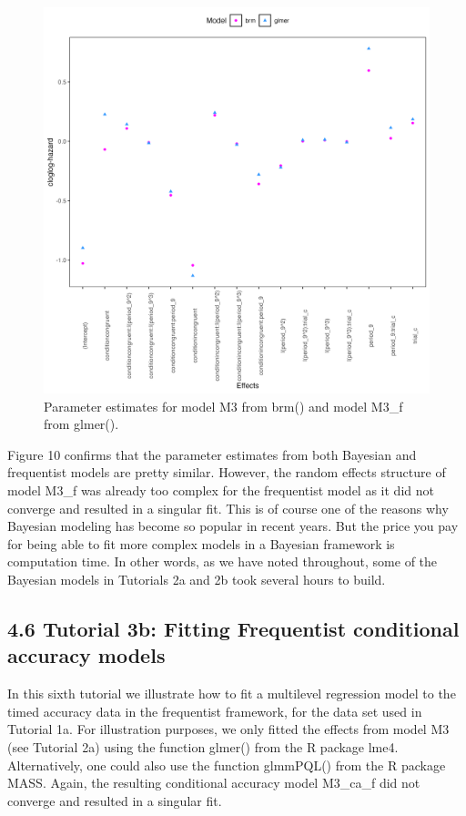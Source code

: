 \documentclass[
  man,floatsintext]{apa6}
\begin{document}
\begin{figure}[H]

{\centering \includegraphics[width=0.8\linewidth,height=0.67\textheight,]{../Tutorial_3_Frequentist/comparison} 

}

\caption{Parameter estimates for model M3 from brm() and model M3\_f from glmer().}\label{fig:plot-comparison}
\end{figure}

Figure 10 confirms that the parameter estimates from both Bayesian and frequentist models are pretty similar. However, the random effects structure of model M3\_f was already too complex for the frequentist model as it did not converge and resulted in a singular fit. This is of course one of the reasons why Bayesian modeling has become so popular in recent years. But the price you pay for being able to fit more complex models in a Bayesian framework is computation time. In other words, as we have noted throughout, some of the Bayesian models in Tutorials 2a and 2b took several hours to build.

\subsection{4.6 Tutorial 3b: Fitting Frequentist conditional accuracy models}\label{tutorial-3b-fitting-frequentist-conditional-accuracy-models}

In this sixth tutorial we illustrate how to fit a multilevel regression model to the timed accuracy data in the frequentist framework, for the data set used in Tutorial 1a. For illustration purposes, we only fitted the effects from model M3 (see Tutorial 2a) using the function glmer() from the R package lme4. Alternatively, one could also use the function glmmPQL() from the R package MASS. Again, the resulting conditional accuracy model M3\_ca\_f did not converge and resulted in a singular fit.
\end{document}
